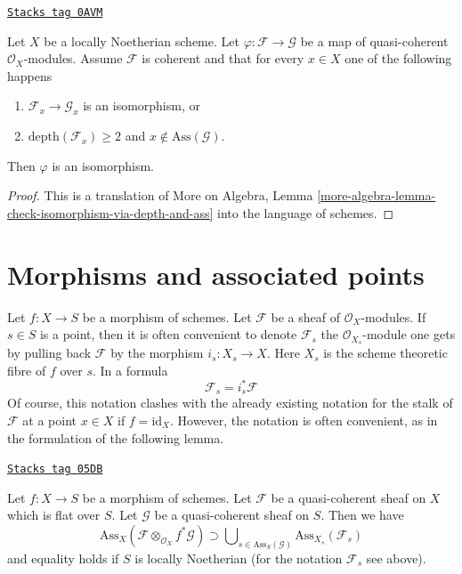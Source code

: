 \begin{lemma}
\label{divisors-lemma-check-isomorphism-via-depth-and-ass}
\href{https://stacks.math.columbia.edu/tag/0AVM}{\texttt{Stacks tag 0AVM}}

Let $X$ be a locally Noetherian scheme. Let
$\varphi : \mathcal{F} \to \mathcal{G}$ be a map of
quasi-coherent $\mathcal{O}_X$-modules. Assume $\mathcal{F}$ is coherent
and that for every $x \in X$ one of the following happens
\begin{enumerate}
\item $\mathcal{F}_x \to \mathcal{G}_x$ is an isomorphism, or
\item $\text{depth}(\mathcal{F}_x) \geq 2$ and
$x \not \in \text{Ass}(\mathcal{G})$.
\end{enumerate}
Then $\varphi$ is an isomorphism.
\end{lemma}

\begin{proof}
This is a translation of More on Algebra, Lemma
\ref{more-algebra-lemma-check-isomorphism-via-depth-and-ass}
into the language of schemes.
\end{proof}

\section{Morphisms and associated points}
\label{divisors-section-morphisms-associated}
Let $f : X \to S$ be a morphism of schemes.
Let $\mathcal{F}$ be a sheaf of $\mathcal{O}_X$-modules.
If $s \in S$ is a point, then it is often convenient to
denote $\mathcal{F}_s$ the $\mathcal{O}_{X_s}$-module
one gets by pulling back $\mathcal{F}$ by the morphism
$i_s : X_s \to X$. Here $X_s$ is the scheme theoretic fibre of $f$ over $s$.
In a formula
$$
\mathcal{F}_s = i_s^*\mathcal{F}
$$
Of course, this notation clashes with the already existing notation
for the stalk of $\mathcal{F}$ at a point $x \in X$ if $f = \text{id}_X$.
However, the notation is often convenient, as in the formulation of
the following lemma.

\begin{lemma}[Bourbaki]
\label{divisors-lemma-bourbaki}
\href{https://stacks.math.columbia.edu/tag/05DB}{\texttt{Stacks tag 05DB}}

Let $f : X \to S$ be a morphism of schemes.
Let $\mathcal{F}$ be a quasi-coherent sheaf on $X$ which is flat over $S$.
Let $\mathcal{G}$ be a quasi-coherent sheaf on $S$.
Then we have
$$
\text{Ass}_X(\mathcal{F} \otimes_{\mathcal{O}_X} f^*\mathcal{G})
\supset
\bigcup\nolimits_{s \in \text{Ass}_S(\mathcal{G})}
\text{Ass}_{X_s}(\mathcal{F}_s)
$$
and equality holds if $S$ is locally Noetherian (for the notation
$\mathcal{F}_s$ see above).
\end{lemma}


